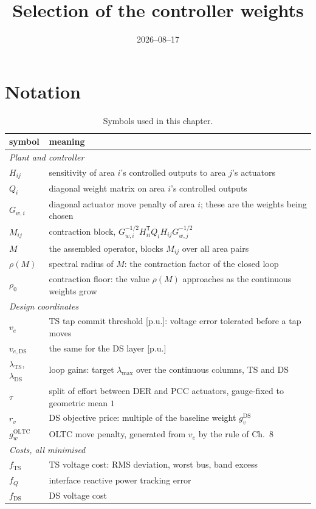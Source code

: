 \documentclass[11pt,a4paper]{article}
\title{Selection of the controller weights}
\author{}
\date{2026--08--17}
\newcommand{\pu}{\ensuremath{\mathrm{p.u.}}}
\newcommand{\lamts}{\ensuremath{\lambda_{\mathrm{TS}}}}
\newcommand{\lamds}{\ensuremath{\lambda_{\mathrm{DS}}}}
\newcommand{\fts}{\ensuremath{f_{\mathrm{TS}}}}
\newcommand{\fq}{\ensuremath{f_{Q}}}
\newcommand{\fds}{\ensuremath{f_{\mathrm{DS}}}}
\newcommand{\gwoltc}{\ensuremath{g_{w}^{\mathrm{OLTC}}}}
\begin{document}
\maketitle

\section{Notation}
\label{sec:wsel:notation}

\begin{table}[htbp]
  \centering
  \caption{Symbols used in this chapter.}
  \label{tab:wsel:symbols}
  \begin{tabular}{ll}
    \toprule
    symbol & meaning \\
    \midrule
    \multicolumn{2}{l}{\emph{Plant and controller}} \\
    $H_{ij}$ & sensitivity of area $i$'s controlled outputs to area $j$'s actuators \\
    $Q_i$ & diagonal weight matrix on area $i$'s controlled outputs \\
    $G_{w,i}$ & diagonal actuator move penalty of area $i$; these are the weights being chosen \\
    $M_{ij}$ & contraction block, $G_{w,i}^{-1/2} H_{ii}^{\mathsf{T}} Q_i H_{ij} G_{w,j}^{-1/2}$ \\
    $M$ & the assembled operator, blocks $M_{ij}$ over all area pairs \\
    $\rho(M)$ & spectral radius of $M$: the contraction factor of the closed loop \\
    $\rho_0$ & contraction floor: the value $\rho(M)$ approaches as the continuous weights grow \\
    \midrule
    \multicolumn{2}{l}{\emph{Design coordinates}} \\
    $v_e$ & TS tap commit threshold [\pu]: voltage error tolerated before a tap moves \\
    $v_{e,\mathrm{DS}}$ & the same for the DS layer [\pu] \\
    \lamts, \lamds & loop gains: target $\lambda_{\max}$ over the continuous columns, TS and DS \\
    $\tau$ & split of effort between DER and PCC actuators, gauge-fixed to geometric mean $1$ \\
    $r_v$ & DS objective price: multiple of the baseline weight $g_v^{\mathrm{DS}}$ \\
    \gwoltc & OLTC move penalty, generated from $v_e$ by the rule of Ch.~8 \\
    \midrule
    \multicolumn{2}{l}{\emph{Costs, all minimised}} \\
    \fts & TS voltage cost: RMS deviation, worst bus, band excess \\
    \fq & interface reactive power tracking error \\
    \fds & DS voltage cost \\
    \bottomrule
  \end{tabular}
\end{table}
\end{document}
